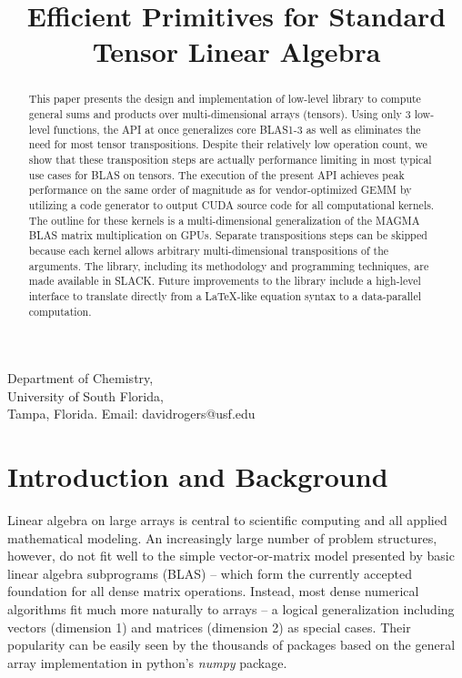 \documentclass[preprint]{sigplanconf}
\begin{document}
\title{ Efficient Primitives for Standard Tensor Linear Algebra}
{Department of Chemistry, \\
University of South Florida, \\
Tampa, Florida.}
{Email: davidrogers@usf.edu}

\maketitle

\begin{abstract}
  This paper presents the design and implementation of low-level
library to compute general sums and products over multi-dimensional arrays (tensors).
Using only 3 low-level functions, the API at once generalizes
core BLAS1-3 as well as eliminates the need for most tensor transpositions.
Despite their relatively low operation count, we show that these transposition steps
are actually performance limiting in most typical use cases for BLAS on tensors.
The execution of the present API achieves peak performance on the same
order of magnitude as for vendor-optimized GEMM
by utilizing a code generator to output CUDA source code for all computational kernels.
The outline for these kernels is a multi-dimensional generalization
of the MAGMA BLAS matrix multiplication on GPUs.  Separate
transpositions steps can be skipped because each kernel allows arbitrary
multi-dimensional transpositions of the arguments.
The library, including its methodology and programming techniques, are
made available in SLACK.  Future improvements to the library include
a high-level interface to translate directly from a \LaTeX{}-like equation
syntax to a data-parallel computation.
\end{abstract}

\section{ Introduction and Background}

  Linear algebra on large arrays is central to scientific computing and all applied mathematical
modeling.  An increasingly large number of problem structures, however,
do not fit well to the simple vector-or-matrix model presented by basic linear
algebra subprograms (BLAS)\cite{blas} -- which form the currently accepted foundation for all
dense matrix operations.  Instead, most dense numerical algorithms fit much more naturally
to arrays -- a logical generalization including vectors (dimension 1) and matrices (dimension 2)
as special cases.  Their popularity can be easily seen by the thousands of packages based
on the general array implementation in python's {\em numpy} package.\cite{numpy}
\end{document}
